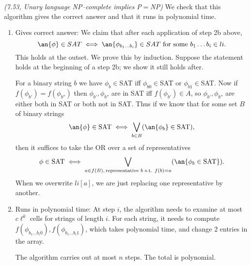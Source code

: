 \begin{problem}{\it(7.53, Unary language NP--complete implies P$=$NP)}
We check that this algorithm gives the correct answer and that it runs in polynomial time.
\begin{enumerate}
\item
Gives correct answer: We claim that after each application of step 2b above,
\[
\an{\phi}\in SAT\iff \an{\phi_{b_1\ldots b_i}}\in SAT\text{ for some $b_1\ldots b_i\in li$}. 
\]
 This holds at the outset. 
We prove this by induction. Suppose the statement holds at the beginning of a step 2b; we show it still holds after. 

For a binary string $b$ we have $\phi_{b}\in$SAT iff $\phi_{b0}\in$SAT or $\phi_{b1}\in$SAT. Now if $f(\phi_{b'})=f(\phi_{b''})$ then $\phi_{b'},\phi_{b''}$ are in SAT iff $f(\phi_{b'})\in A$, so $\phi_{b'},\phi_{b''}$ are either both in SAT or both not in SAT. Thus if we know that for some set $B$ of binary strings
\[
\an{\phi}\in \text{SAT}\iff \bigvee_{b\in B} (\an{\phi_b}\in \text{SAT}),
\]
then it suffices to take the OR over a set of representatives
\[
\phi\in \text{SAT}\iff \bigvee_{a\in f(B),\,\text{representative }b\text{ s.t. }f(b)=a}(\an{\phi_b\in \text{SAT}}).
\]
When we overwrite $li[a]$, we are just replacing one representative by another.

\item
Runs in polynomial time: At step $i$, the algorithm needs to examine at most $c\ell^k$ cells for strings of length $i$. For each string, it needs to compute $f(\phi_{b_1\ldots b_i0}),f(\phi_{b_1\ldots b_i1})$, which takes polynomial time, and change 2 entries in the array.

The algorithm carries out at most $n$ steps. The total is polynomial.
\end{enumerate}
\end{problem}
